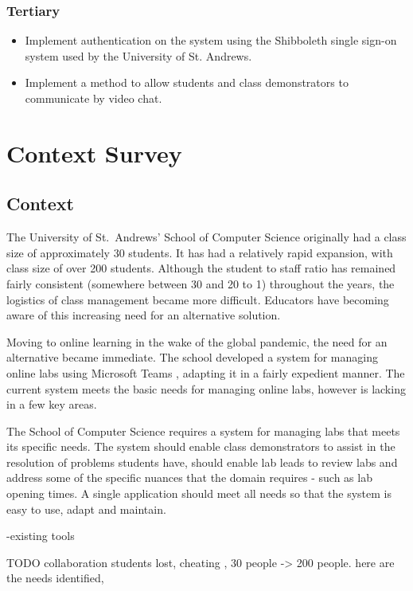 \documentclass[a4paper,11pt]{article}
\begin{document}
\subsubsection*{Tertiary}
\begin{itemize}
    \item Implement authentication on the system using the Shibboleth single sign-on system used by the University of St. Andrews.
    \item Implement a method to allow students and class demonstrators to communicate by video chat. 
\end{itemize}

\newpage
\section{Context Survey}

\subsection{Context}

The University of St.\ Andrews' School of Computer Science originally had a class size of approximately 30 students. It has had a relatively rapid expansion, with class size of over 200 students. Although the student to staff ratio has remained fairly consistent (somewhere between 30 and 20 to 1) throughout the years, the logistics of class management became more difficult. Educators have becoming aware of this increasing need for an alternative solution.

Moving to online learning in the wake of the global pandemic, the need for an alternative became immediate. The school developed a system for managing online labs using Microsoft Teams \cite{teams}, adapting it in a fairly expedient manner. The current system meets the basic needs for managing online labs, however is lacking in a few key areas.  

The School of Computer Science requires a system for managing labs that meets its specific needs. The system should enable class demonstrators to assist in the resolution of problems students have, should enable lab leads to review labs and address some of the specific nuances that the domain requires - such as lab opening times. A single application should meet all needs so that the system is easy to use, adapt and maintain.

-existing tools

TODO collaboration students lost, cheating , 30 people -> 200 people. here are the needs identified, 
\end{document}
